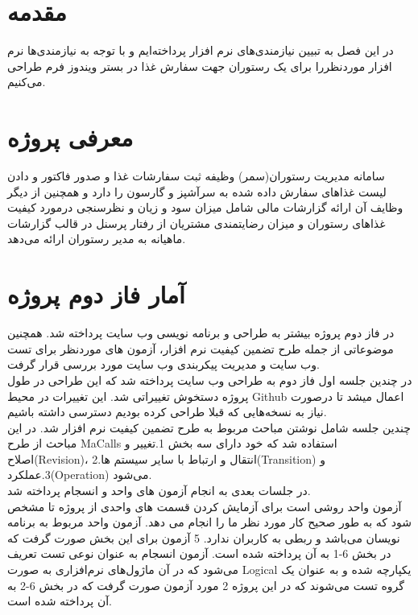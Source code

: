 \documentclass[a4paper, 12pt]{report}
\begin{document}
	
	\tableofcontents
	\chapter{مقدمه}
	\large
	در این فصل به تبیین نیازمندی‌های نرم افزار پرداخته‌ایم و با توجه به نیازمندی‌ها نرم افزار موردنظررا برای یک رستوران جهت سفارش غذا در بستر ویندوز فرم طراحی می‌کنیم.
		
	
	\chapter{معرفی پروژه}
	سامانه مدیریت رستوران(سمر) وظیفه ثبت سفارشات غذا و صدور فاکتور و دادن لیست غذاهای سفارش داده شده به سرآشپز و گارسون را دارد و همچنین از دیگر وظایف آن ارائه گزارشات مالی شامل میزان سود و زیان و نظرسنجی درمورد کیفیت غذاهای رستوران و میزان رضایتمندی مشتریان از رفتار پرسنل در قالب گزارشات ماهیانه به مدیر رستوران ارائه می‌دهد. 
	

	\chapter{آمار فاز دوم پروژه}
	
	در فاز دوم پروژه بیشتر به طراحی و برنامه نویسی وب سایت پرداخته شد.
	همچنین موضوعاتی از جمله طرح تضمین کیفیت نرم افزار، آزمون های موردنظر برای تست وب سایت و مدیریت پیکربندی وب سایت مورد بررسی قرار گرفت.\\
	
	در چندین جلسه اول فاز دوم به طراحی وب سایت پرداخته شد که این طراحی در طول پروژه دستخوش تغییراتی شد. این تغییرات در محیط Github اعمال میشد تا درصورت نیاز به نسخه‌هایی که قبلا طراحی کرده بودیم دسترسی داشته باشیم.\\
	
	چندین جلسه شامل نوشتن مباحث مربوط به طرح تضمین کیفیت نرم افزار شد. در این مباحث از طرح MaCalls استفاده شد که خود دارای سه بخش 1.تغییر و اصلاح(Revision)، 2.انتقال و ارتباط با سایر سیستم ها(Transition) و 3.عملکرد(Operation) می‌شود.\\
	
	در جلسات بعدی به انجام آزمون های واحد و انسجام پرداخته شد. \\
	
	آزمون واحد  روشی است برای آزمایش کردن قسمت های واحدی از پروژه تا مشخص شود که به طور صحیح کار مورد نظر ما را انجام می دهد. آزمون واحد مربوط به برنامه نویسان می‌باشد و ربطی به کاربران ندارد. 5 آزمون برای این بخش صورت گرفت که در بخش 6-1 به آن پرداخته شده است.
	آزمون انسجام  به عنوان نوعی تست تعریف می‌شود که در آن ماژول‌های نرم‌افزاری به صورت Logical یکپارچه شده و به عنوان یک گروه تست می‌شوند که در این پروژه 2 مورد آزمون صورت گرفت که در بخش 6-2 به آن پرداخته شده است.\\
	
\end{document}
